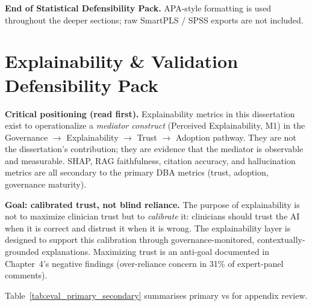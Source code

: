 \noindent\textbf{End of Statistical Defensibility Pack.} APA-style formatting is used throughout the deeper sections; raw SmartPLS / SPSS exports are not included.


\section*{Explainability \& Validation Defensibility Pack}
\label{sec:explain_defensibility_pack}

\noindent\textbf{Critical positioning (read first).} Explainability metrics in this dissertation exist to operationalize a \emph{mediator construct} (Perceived Explainability, M1) in the Governance $\to$ Explainability $\to$ Trust $\to$ Adoption pathway. They are not the dissertation's contribution; they are evidence that the mediator is observable and measurable. SHAP, RAG faithfulness, citation accuracy, and hallucination metrics are all secondary to the primary DBA metrics (trust, adoption, governance maturity).

\noindent\textbf{Goal: calibrated trust, not blind reliance.} The purpose of explainability is not to maximize clinician trust but to \emph{calibrate} it: clinicians should trust the AI when it is correct and distrust it when it is wrong. The explainability layer is designed to support this calibration through governance-monitored, contextually-grounded explanations. Maximizing trust is an anti-goal documented in Chapter~4's negative findings (over-reliance concern in 31\% of expert-panel comments).

\noindent Table~\ref{tab:eval_primary_secondary} summarises primary vs for appendix review.

